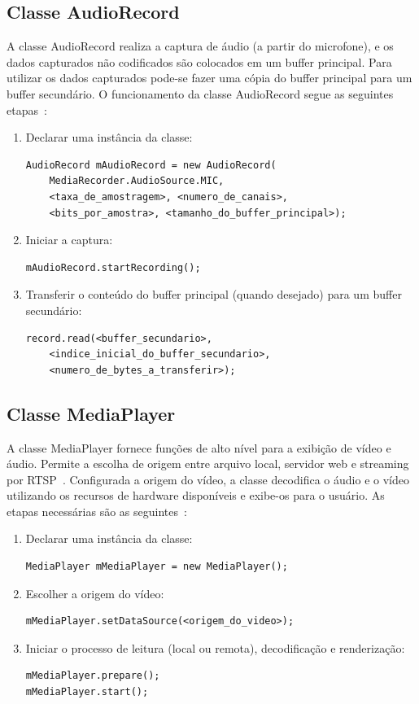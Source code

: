 \documentclass{acm_proc_article-sp}
\begin{document}
\subsection{Classe AudioRecord}\label{audio_record}
A classe AudioRecord realiza a captura de áudio (a partir do microfone), e os dados capturados não codificados são colocados em um buffer principal. Para utilizar os dados capturados pode-se fazer uma cópia do buffer principal para um buffer secundário. O funcionamento da classe AudioRecord segue as seguintes etapas~\cite{developers_android}:
\begin{enumerate}
 \item Declarar uma instância da classe:
  \begin{lstlisting}
AudioRecord mAudioRecord = new AudioRecord(
    MediaRecorder.AudioSource.MIC, 
    <taxa_de_amostragem>, <numero_de_canais>,
    <bits_por_amostra>, <tamanho_do_buffer_principal>);
  \end{lstlisting}
 \item Iniciar a captura:
  \begin{lstlisting}
mAudioRecord.startRecording();
  \end{lstlisting}
 \item Transferir o conteúdo do buffer principal (quando desejado) para um buffer secundário:
  \begin{lstlisting}
record.read(<buffer_secundario>,
    <indice_inicial_do_buffer_secundario>,
    <numero_de_bytes_a_transferir>);
  \end{lstlisting}
\end{enumerate}

\subsection{Classe MediaPlayer}\label{media_player}
A classe MediaPlayer fornece funções de alto nível para a exibição de vídeo e áudio. Permite a escolha de origem entre arquivo local, servidor web e streaming por RTSP~\cite{pro_android}. Configurada a origem do vídeo, a classe decodifica o áudio e o vídeo utilizando os recursos de hardware disponíveis e exibe-os para o usuário. As etapas necessárias são as seguintes~\cite{developers_android}:
\begin{enumerate}
 \item Declarar uma instância da classe:
  \begin{lstlisting}
MediaPlayer mMediaPlayer = new MediaPlayer();
  \end{lstlisting}
 \item Escolher a origem do vídeo:
  \begin{lstlisting}
mMediaPlayer.setDataSource(<origem_do_video>);
  \end{lstlisting}
 \item Iniciar o processo de leitura (local ou remota), decodificação e renderização:
  \begin{lstlisting}
mMediaPlayer.prepare();
mMediaPlayer.start();
  \end{lstlisting}
\end{enumerate}
\end{document}
